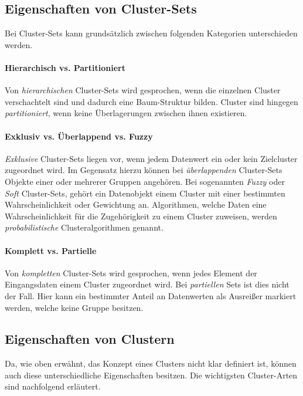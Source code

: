 \subsection{Eigenschaften von Cluster-Sets}
\label{sec:grund_property_cluster_sets}

Bei Cluster-Sets kann grundsätzlich zwischen folgenden Kategorien unterschieden werden.

\paragraph{Hierarchisch vs. Partitioniert}
Von \textit{hierarchischen} Cluster-Sets wird gesprochen, wenn die einzelnen Cluster verschachtelt sind und dadurch eine
Baum-Struktur bilden. Cluster sind hingegen \textit{partitioniert}, wenn keine Überlagerungen zwischen ihnen existieren.

\paragraph{Exklusiv vs. Überlappend vs. Fuzzy}
\textit{Exklusive} Cluster-Sets liegen vor, wenn jedem Datenwert ein oder kein Zielcluster zugeordnet wird.
Im Gegensatz hierzu können bei \textit{überlappenden} Cluster-Sets Objekte einer oder mehrerer Gruppen angehören.
Bei sogenannten \textit{Fuzzy} oder \textit{Soft} Cluster-Sets, gehört ein Datenobjekt einem Cluster
mit einer bestimmten Wahrscheinlichkeit oder Gewichtung an. Algorithmen, welche Daten eine
Wahrscheinlichkeit für die Zugehörigkeit zu einem Cluster zuweisen, werden \textit{probabilistische}
Clusteralgorithmen genannt.

\paragraph{Komplett vs. Partielle}
Von \textit{kompletten} Cluster-Sets wird gesprochen, wenn jedes Element der Eingangsdaten einem Cluster zugeordnet wird.
Bei \textit{partiellen} Sets ist dies nicht der Fall. Hier kann ein bestimmter Anteil an Datenwerten als Ausreißer markiert
werden, welche keine Gruppe besitzen.

\subsection{Eigenschaften von Clustern}

Da, wie oben erwähnt, das Konzept eines Clusters nicht klar definiert ist, können auch diese unterschiedliche
Eigenschaften besitzen. Die wichtigsten Cluster-Arten sind nachfolgend erläutert.

